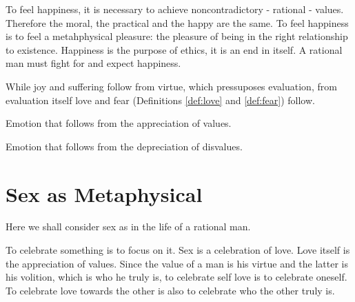         To feel happiness, it is necessary to achieve noncontradictory - rational - values. Therefore the moral, the practical and the happy are the same. To feel happiness is to feel a metahphysical pleasure: the pleasure of being in the right relationship to existence. Happiness is the purpose of ethics, it is an end in itself. A rational man must fight for and expect happiness.

        While joy and suffering follow from virtue, which pressuposes evaluation, from evaluation itself love and fear (Definitions \ref{def:love} and \ref{def:fear}) follow.

        \begin{definition}[Love]
        \label{def:love}
            Emotion that follows from the appreciation of values.
        \end{definition}

        \begin{definition}[Fear]
        \label{def:fear}
            Emotion that follows from the depreciation of disvalues.
        \end{definition}

    \section{Sex as Metaphysical}

        Here we shall consider sex as in the life of a rational man.

        To celebrate something is to focus on it. Sex is a celebration of love. Love itself is the appreciation of values. Since the value of a man is his virtue and the latter is his volition, which is who he truly is, to celebrate self love is to celebrate oneself. To celebrate love towards the other is also to celebrate who the other truly is.

        